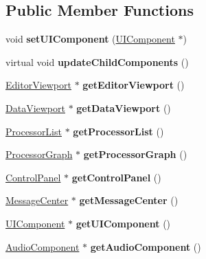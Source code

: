 \subsection*{Public Member Functions}
\begin{DoxyCompactItemize}
\item 
\hypertarget{classAccessClass_ae6c601f53b3fd103bd7cd40f51c9c235}{void {\bfseries set\-U\-I\-Component} (\hyperlink{classUIComponent}{U\-I\-Component} $\ast$)}\label{classAccessClass_ae6c601f53b3fd103bd7cd40f51c9c235}

\item 
\hypertarget{classAccessClass_aa23dfab04264a78db261ccb8ac30f1ff}{virtual void {\bfseries update\-Child\-Components} ()}\label{classAccessClass_aa23dfab04264a78db261ccb8ac30f1ff}

\item 
\hypertarget{classAccessClass_a72bef8d5db8f8984f7b40f627a43998d}{\hyperlink{classEditorViewport}{Editor\-Viewport} $\ast$ {\bfseries get\-Editor\-Viewport} ()}\label{classAccessClass_a72bef8d5db8f8984f7b40f627a43998d}

\item 
\hypertarget{classAccessClass_a69500d6b6d466414e92eb9b31c8cb90d}{\hyperlink{classDataViewport}{Data\-Viewport} $\ast$ {\bfseries get\-Data\-Viewport} ()}\label{classAccessClass_a69500d6b6d466414e92eb9b31c8cb90d}

\item 
\hypertarget{classAccessClass_a18c4d1e45c74d6564d534bfe86bfc5da}{\hyperlink{classProcessorList}{Processor\-List} $\ast$ {\bfseries get\-Processor\-List} ()}\label{classAccessClass_a18c4d1e45c74d6564d534bfe86bfc5da}

\item 
\hypertarget{classAccessClass_abe0403e279f6047b2f307eaf9c913404}{\hyperlink{classProcessorGraph}{Processor\-Graph} $\ast$ {\bfseries get\-Processor\-Graph} ()}\label{classAccessClass_abe0403e279f6047b2f307eaf9c913404}

\item 
\hypertarget{classAccessClass_ae2559bca16f366b3b60bb64b062259cb}{\hyperlink{classControlPanel}{Control\-Panel} $\ast$ {\bfseries get\-Control\-Panel} ()}\label{classAccessClass_ae2559bca16f366b3b60bb64b062259cb}

\item 
\hypertarget{classAccessClass_abb4f62a65c45128a71eee802544fd3d1}{\hyperlink{classMessageCenter}{Message\-Center} $\ast$ {\bfseries get\-Message\-Center} ()}\label{classAccessClass_abb4f62a65c45128a71eee802544fd3d1}

\item 
\hypertarget{classAccessClass_a45bcba11a6ba8a754d76d6a3ee11fb26}{\hyperlink{classUIComponent}{U\-I\-Component} $\ast$ {\bfseries get\-U\-I\-Component} ()}\label{classAccessClass_a45bcba11a6ba8a754d76d6a3ee11fb26}

\item 
\hypertarget{classAccessClass_adca6f9ebbe535a03c024eb673a096972}{\hyperlink{classAudioComponent}{Audio\-Component} $\ast$ {\bfseries get\-Audio\-Component} ()}\label{classAccessClass_adca6f9ebbe535a03c024eb673a096972}

\end{DoxyCompactItemize}
